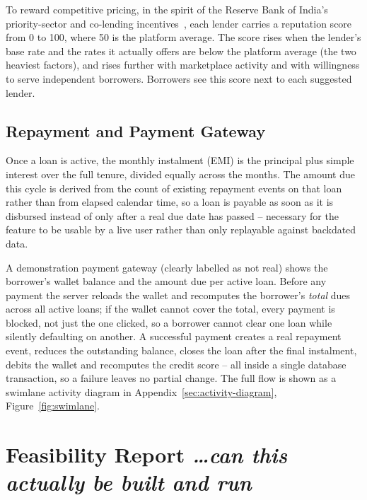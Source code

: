 \documentclass[11pt,a4paper]{article}
\newcommand{\BvrHint}[1]{%
  {\normalfont\normalsize\itshape\hfill #1}}
\begin{document}
To reward competitive pricing, in the spirit of the Reserve Bank of India's
priority-sector and co-lending incentives~\cite{rbi}, each lender carries a
reputation score from 0 to 100, where 50 is the platform average. The score
rises when the lender's base rate and the rates it actually offers are
below the platform average (the two heaviest factors), and rises further
with marketplace activity and with willingness to serve independent
borrowers. Borrowers see this score next to each suggested lender.

\subsection{Repayment and Payment Gateway}
Once a loan is active, the monthly instalment (EMI) is the principal plus
simple interest over the full tenure, divided equally across the months.
The amount due this cycle is derived from the count of existing repayment
events on that loan rather than from elapsed calendar time, so a loan is
payable as soon as it is disbursed instead of only after a real due date
has passed -- necessary for the feature to be usable by a live user rather
than only replayable against backdated data.

A demonstration payment gateway (clearly labelled as not real) shows the
borrower's wallet balance and the amount due per active loan. Before any
payment the server reloads the wallet and recomputes the borrower's
\emph{total} dues across all active loans; if the wallet cannot cover the
total, every payment is blocked, not just the one clicked, so a borrower
cannot clear one loan while silently defaulting on another. A successful
payment creates a real repayment event, reduces the outstanding balance,
closes the loan after the final instalment, debits the wallet and
recomputes the credit score -- all inside a single database transaction, so
a failure leaves no partial change. The full flow is shown as a swimlane
activity diagram in Appendix~\ref{sec:activity-diagram},
Figure~\ref{fig:swimlane}.

\section{Feasibility Report%
\BvrHint{\ldots can this actually be built and run}}
\label{sec:feas}
\end{document}
